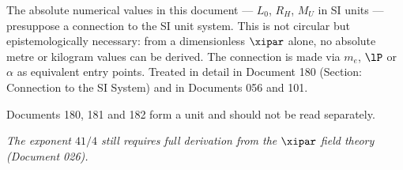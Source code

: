 \begin{foundation}
The absolute numerical values in this document — $L_0$, $R_H$, $M_U$ in SI units — presuppose a connection to the SI unit system. This is not circular but epistemologically necessary: from a dimensionless $\xipar$ alone, no absolute metre or kilogram values can be derived. The connection is made via $m_e$, $\lP$ or $\alpha$ as equivalent entry points. Treated in detail in Document 180 (Section: Connection to the SI System) and in Documents 056 and 101.

Documents 180, 181 and 182 form a unit and should not be read separately.
\end{foundation}

\vspace{1cm}
\noindent\textit{The exponent $41/4$ still requires full derivation from the $\xipar$ field theory (Document 026).}
